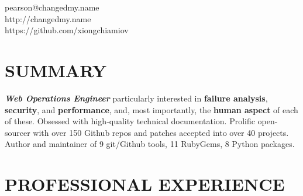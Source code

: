 \documentclass[margin,line]{resume}
\begin{document}
{
    \hfill pearson@changedmy.name           \vspace{0mm}\\\vspace{0mm}%
    \hfill http://changedmy.name            \vspace{0mm}\\\vspace{0mm}%
    \hfill https://github.com/xiongchiamiov \vspace{0mm}\\\vspace{-9mm}%
}

\begin{resume}

    \vspace{-3mm}

    \section{\mysidestyle \textbf{\large{S}\small{UMMARY}}}

    \textbf{\textsl{Web Operations Engineer}} particularly interested in \textbf{failure analysis}, \textbf{security}, and \textbf{performance}, and, most importantly, the \textbf{human aspect} of each of these.  Obsessed with high-quality technical documentation.  Prolific open-sourcer with over 150 Github repos and patches accepted into over 40 projects.  Author and maintainer of 9 git/Github tools, 11 RubyGems, 8 Python packages.

    \vspace{-1mm}

\sectionline

    \section{\mysidestyle \textbf{\large{P}\small{ROFESSIONAL} \large{E}\small{XPERIENCE}}}


\end{resume}
\end{document}
